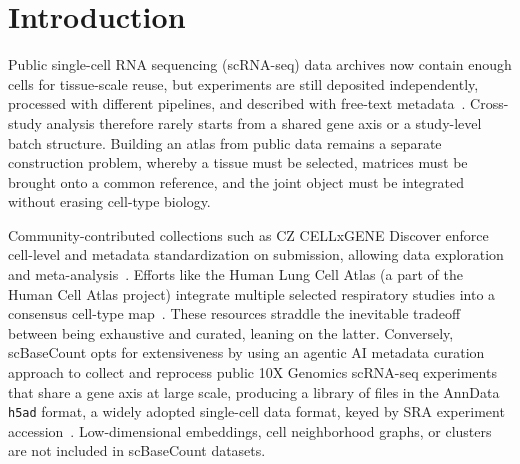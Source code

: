 \documentclass[10pt,letterpaper]{article}
\begin{document}
%


\clearpage
{}
\linenumbers

\section*{Introduction}
Public single-cell RNA sequencing (scRNA-seq) data archives now contain enough cells for tissue-scale reuse, but experiments are still deposited independently, processed with different pipelines, and described with free-text metadata~\parencite{lueckenBenchmarkingAtlaslevelData2022,muellerBuildingOptimizedSinglecell2026}. Cross-study analysis therefore rarely starts from a shared gene axis or a study-level batch structure. Building an atlas from public data remains a separate construction problem, whereby a tissue must be selected, matrices must be brought onto a common reference, and the joint object must be integrated without erasing cell-type biology.

Community-contributed collections such as CZ CELLxGENE Discover enforce cell-level and metadata standardization on submission, allowing data exploration and meta-analysis~\parencite{czicellscienceprogramCZCELLxGENEDiscover2025}. Efforts like the Human Lung Cell Atlas (a part of the Human Cell Atlas project) integrate multiple selected respiratory studies into a consensus cell-type map~\parencite{sikkemaIntegratedCellAtlas2023,regevHumanCellAtlas}. These resources straddle the inevitable tradeoff between being exhaustive and curated, leaning on the latter. Conversely, scBaseCount opts for extensiveness by using an agentic AI metadata curation approach to collect and reprocess public 10X Genomics scRNA-seq experiments that share a gene axis at large scale, producing a library of files in the AnnData \texttt{h5ad} format, a widely adopted single-cell data format, keyed by SRA experiment accession~\parencite{virshupAnndataAccessStore2024,youngblutScBaseCountAIAgentcurated2025,leinonenSequenceReadArchive2011}. Low-dimensional embeddings, cell neighborhood graphs, or clusters are not included in scBaseCount datasets.
\end{document}
